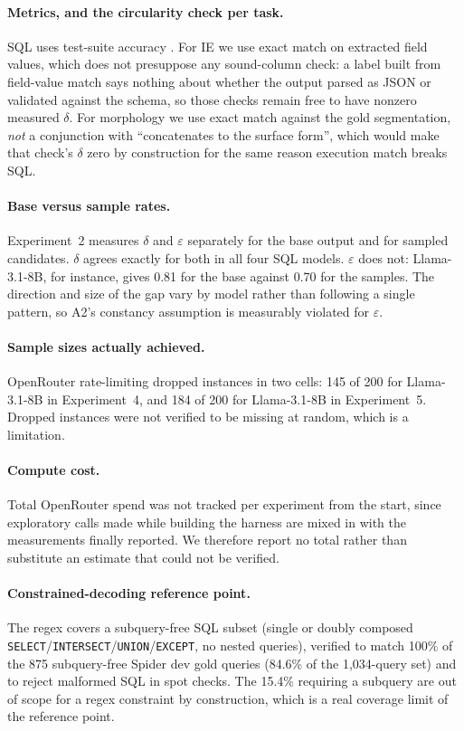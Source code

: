\documentclass[11pt]{article}
\begin{document}
\paragraph{Metrics, and the circularity check per task.} SQL uses test-suite
accuracy \citep{zhong2020testsuite}. For IE we use exact match on extracted
field values, which does not presuppose any sound-column check: a label built
from field-value match says nothing about whether the output parsed as JSON or
validated against the schema, so those checks remain free to have nonzero
measured $\delta$. For morphology we use exact match against the gold
segmentation, \emph{not} a conjunction with ``concatenates to the surface
form'', which would make that check's $\delta$ zero by construction for the same
reason execution match breaks SQL.

\paragraph{Base versus sample rates.} Experiment~2 measures $\delta$ and
$\varepsilon$ separately for the base output and for sampled candidates.
$\delta$ agrees exactly for both in all four SQL models. $\varepsilon$ does not:
Llama-3.1-8B, for instance, gives 0.81 for the base against 0.70 for the
samples. The direction and size of the gap vary by model rather than following a
single pattern, so A2's constancy assumption is measurably violated for
$\varepsilon$.

\paragraph{Sample sizes actually achieved.} OpenRouter rate-limiting dropped
instances in two cells: 145 of 200 for Llama-3.1-8B in Experiment~4, and 184 of
200 for Llama-3.1-8B in Experiment~5. Dropped instances were not verified to be
missing at random, which is a limitation.

\paragraph{Compute cost.} Total OpenRouter spend was not tracked per experiment
from the start, since exploratory calls made while building the harness are
mixed in with the measurements finally reported. We therefore report no total
rather than substitute an estimate that could not be verified.

\paragraph{Constrained-decoding reference point.} The regex covers a
subquery-free SQL subset (single or doubly composed
\texttt{SELECT}/\texttt{INTERSECT}/\texttt{UNION}/\texttt{EXCEPT}, no nested
queries), verified to match 100\% of the 875 subquery-free Spider dev gold
queries (84.6\% of the 1{,}034-query set) and to reject malformed SQL in spot
checks. The 15.4\% requiring a subquery are out of scope for a regex constraint
by construction, which is a real coverage limit of the reference point.
\end{document}
